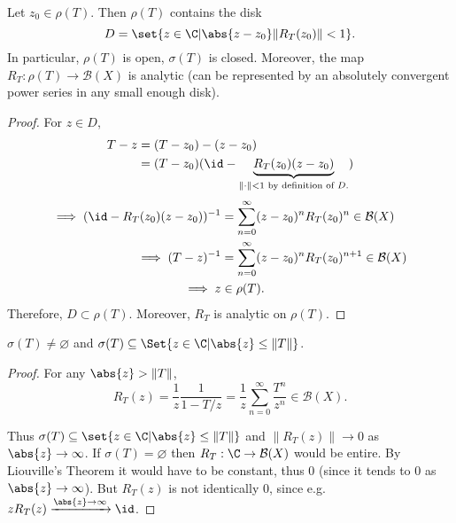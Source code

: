 \documentclass{article}
\renewcommand{\emptyset}{\varnothing}
\begin{document}

\begin{prop}
    Let $z_0 \in \rho(T)$. Then $\rho(T)$ contains the disk
    \begin{equation*}
        D = \set{z \in \C | \abs{z - z_0} \|R_T(z_0)\| < 1}.
    \end{equation*}
    In particular, $\rho(T)$ is open, $\sigma(T)$ is closed.
    Moreover, the map $R_T : \rho(T) \to \mathcal{B}(X)$ is analytic (can be represented by an absolutely convergent power series in any small enough disk).
\end{prop}

\begin{proof}
    For $z \in D$,
    \begin{align*}
        T - z &= (T-z_0) - (z - z_0) \\
              &= (T - z_0)(\id - \underbrace{R_T(z_0)(z - z_0)}_{\|\cdot\| < 1 \text{ by definition of $D$.}})
    \end{align*}
    \begin{align*}
        \implies (\id - R_T(z_0)(z-z_0))^{-1} &= \sum_{n=0}^\infty (z-z_0)^n R_T(z_0)^n \in \mathcal{B}(X) \\
        \implies (T-z)^{-1} &= \sum_{n=0}^\infty (z-z_0)^n R_T(z_0)^{n+1} \in \mathcal{B}(X) \\
        \implies z &\in \rho(T). \\
    \end{align*}
    Therefore, $D \subset \rho(T)$. Moreover, $R_T$ is analytic on $\rho(T)$.
\end{proof}

\begin{cor}
    $\sigma(T) \neq \emptyset$ and $\sigma(T) \subseteq \Set{z \in \C | \abs{z} \leq \|T\|}$.
\end{cor}

\begin{proof}
    For any $\abs{z} > \|T\|$,
    \begin{equation*}
        R_T(z) = \frac{1}{z} \frac{1}{1 - T/z} = \frac{1}{z} \sum_{n=0}^\infty \frac{T^n}{z^n} \in \mathcal{B}(X).
    \end{equation*}

    Thus $\sigma(T) \subseteq \set{z \in \C | \abs{z} \leq \|T\|}$ and $\|R_T(z)\| \to 0$ as $\abs{z} \to \infty$.
    If $\sigma(T) = \emptyset$ then $R_T: \C \to \mathcal{B}(X)$ would be entire.
    By Liouville's Theorem it would have to be constant, thus $0$ (since it tends to $0$ as $\abs{z} \to \infty$).
    But $R_T(z)$ is not identically $0$, since e.g. $z R_T(z) \xrightarrow{\abs{z} \to \infty} \id$.
\end{proof}
\end{document}

